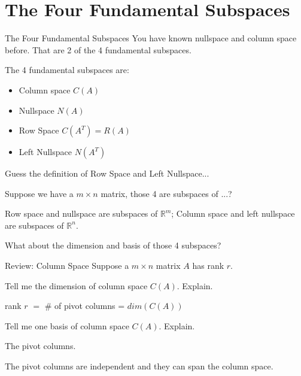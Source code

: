 \documentclass{beamer}
\begin{document}
\section{The Four Fundamental Subspaces}
\begin{frame}{The Four Fundamental Subspaces}
You have known nullspace and column space before. That are 2 of the 4 fundamental subspaces.

\vspace{3pt}
The 4 fundamental subspaces are:
\begin{itemize}
    \item Column space $C(A)$
    \item Nullspace $N(A)$
    \item Row Space $C(A^T)=R(A)$
    \item Left Nullspace  $N(A^T)$
\end{itemize}

Guess the definition of Row Space and Left Nullspace...

\vspace{3pt}
Suppose we have a $m \times n$ matrix, those 4 are subspaces of ...?

\vspace{3pt}
Row space and nullspace are subspaces of $\mathbb{R}^m$; Column space and left nullspace are subspaces of $\mathbb{R}^n$.

\vspace{3pt}
What about the dimension and basis of those 4 subspaces?
\end{frame}

\begin{frame}{Review: Column Space}
Suppose a $m \times n$ matrix $A$ has rank $r$.

\vspace{3pt}
Tell me the dimension of column space $C(A)$. Explain.

\begin{center}
    rank $r$ $=$ \# of pivot columns = $dim(C(A))$
\end{center}

Tell me one basis of column space $C(A)$. Explain.

\begin{center}
    The pivot columns.
\end{center}

The pivot columns are independent and they can span the column space.
\end{frame}
\end{document}
